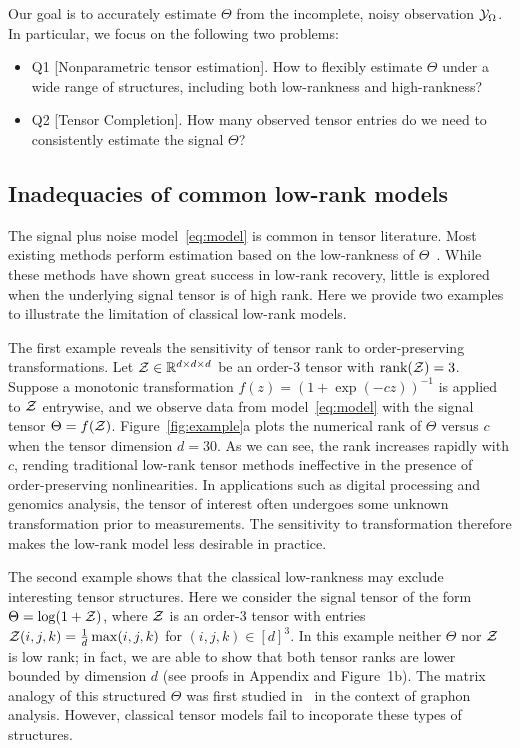 \documentclass{article}
\theoremstyle{plain}
\theoremstyle{definition}
\begin{document}
Our goal is to accurately estimate $\Theta$ from the incomplete, noisy observation $\mathcal{Y}_\Omega$. In particular, we focus on the following two problems:
\begin{itemize}[leftmargin=*]
\item Q1 [Nonparametric tensor estimation]. How to flexibly estimate $\Theta$ under a wide range of structures, including both low-rankness and high-rankness?
\item Q2 [Tensor Completion]. How many observed tensor entries do we need to consistently estimate the signal $\Theta$?
\end{itemize}


\subsection{Inadequacies of common low-rank models}
The signal plus noise model~\eqref{eq:model} is common in tensor literature. Most existing methods perform estimation based on the low-rankness of $\Theta$~\cite{anandkumar2014tensor,montanari2018spectral,kadmon2018statistical,cai2019nonconvex}. While these methods have shown great success in low-rank recovery, little is explored when the underlying signal tensor is of high rank. Here we provide two examples to illustrate the limitation of classical low-rank models.

The first example reveals the sensitivity of tensor rank to order-preserving transformations. Let $\mathcal{Z} \in \mathbb{R}^{d\times d\times d}$ be an order-3 tensor with $\text{rank}(\mathcal{Z})=3$. Suppose a monotonic transformation $f(z)=(1+\exp(-cz))^{-1}$ is applied to $\mathcal{Z}$ entrywise, and we observe data from model~\eqref{eq:model} with the signal tensor $\Theta=f(\mathcal{Z})$. Figure~\ref{fig:example}a plots the numerical rank of $\Theta$ versus $c$ when the tensor dimension $d=30$. As we can see, the rank increases rapidly with $c$, rending traditional low-rank tensor methods ineffective in the presence of order-preserving nonlinearities. In applications such as digital processing and genomics analysis, the tensor of interest often undergoes some unknown transformation prior to measurements. The sensitivity to transformation therefore makes the low-rank model less desirable in practice. 

The second example shows that the classical low-rankness may exclude interesting tensor structures. Here we consider the signal tensor of the form $\Theta=\log(1+\mathcal{Z})$, where $\mathcal{Z}$ is an order-3 tensor with entries $\mathcal{Z}(i,j,k)={1\over d}\max(i,j,k)$ for $(i,j,k)\in[d]^3$. In this example neither $\Theta$ nor $\mathcal{Z}$ is low rank; in fact, we are able to show that both tensor ranks are lower bounded by dimension $d$ (see proofs in Appendix and Figure~1b). The matrix analogy of this structured $\Theta$ was first studied in~\citet{chan2014consistent} in the context of graphon analysis. However, classical tensor models fail to incoporate these types of structures.  
\end{document}
